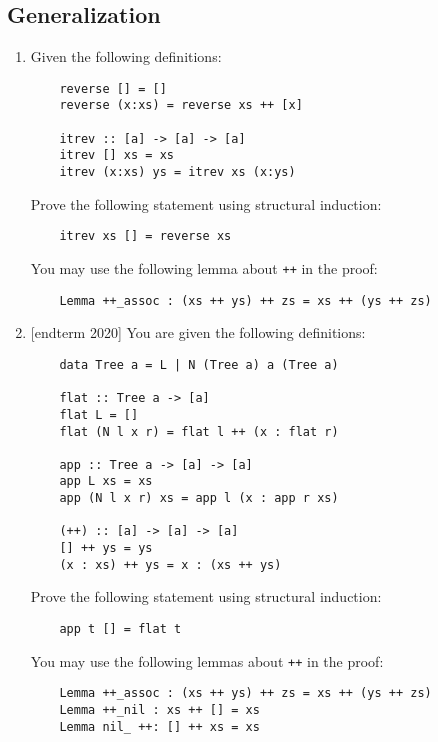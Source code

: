 \documentclass{article}
\def\code#1{\texttt{#1}}
\begin{document}
\subsection{Generalization}
\begin{enumerate}
    \item Given the following definitions:
        \begin{verbatim}
    reverse [] = []
    reverse (x:xs) = reverse xs ++ [x]

    itrev :: [a] -> [a] -> [a]
    itrev [] xs = xs
    itrev (x:xs) ys = itrev xs (x:ys)
        \end{verbatim}
        Prove the following statement using structural induction:
        \begin{verbatim}
    itrev xs [] = reverse xs
        \end{verbatim}
        You may use the following lemma about \code{++} in the proof:
        \begin{verbatim}
    Lemma ++_assoc : (xs ++ ys) ++ zs = xs ++ (ys ++ zs)
        \end{verbatim}

    \item {[endterm 2020]} You are given the following definitions:
        \begin{verbatim}
    data Tree a = L | N (Tree a) a (Tree a)

    flat :: Tree a -> [a]
    flat L = []
    flat (N l x r) = flat l ++ (x : flat r)

    app :: Tree a -> [a] -> [a]
    app L xs = xs
    app (N l x r) xs = app l (x : app r xs)

    (++) :: [a] -> [a] -> [a]
    [] ++ ys = ys
    (x : xs) ++ ys = x : (xs ++ ys)
        \end{verbatim}
        Prove the following statement using structural induction:
        \begin{verbatim}
    app t [] = flat t
        \end{verbatim}
        You may use the following lemmas about \code{++} in the proof:
        \begin{verbatim}
    Lemma ++_assoc : (xs ++ ys) ++ zs = xs ++ (ys ++ zs)
    Lemma ++_nil : xs ++ [] = xs
    Lemma nil_ ++: [] ++ xs = xs
        \end{verbatim}
\end{enumerate}
\end{document}

